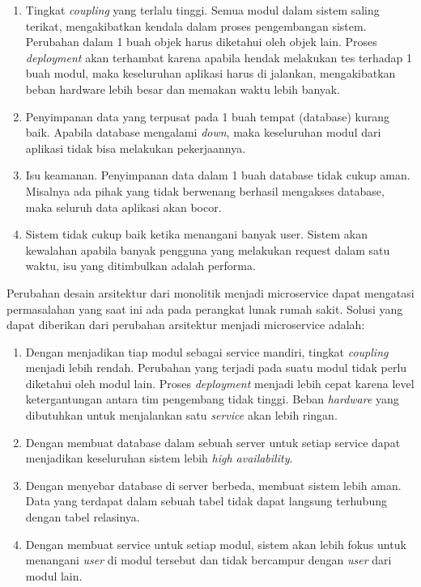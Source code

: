 \begin{enumerate}[leftmargin=*]
	\item Tingkat \textit{coupling} yang terlalu tinggi. Semua modul dalam sistem saling terikat, mengakibatkan kendala dalam proses pengembangan sistem. Perubahan dalam 1 buah objek harus diketahui oleh objek lain. Proses \textit{deployment} akan terhambat karena apabila hendak melakukan tes terhadap 1 buah modul, maka keseluruhan aplikasi harus di jalankan, mengakibatkan beban hardware lebih besar dan memakan waktu lebih banyak.
	\item Penyimpanan data yang terpusat pada 1 buah tempat (database) kurang baik. Apabila database mengalami \textit{down}, maka keseluruhan modul dari aplikasi tidak bisa melakukan pekerjaannya.
	\item Isu keamanan. Penyimpanan data dalam 1 buah database tidak cukup aman. Misalnya ada pihak yang tidak berwenang berhasil mengakses database, maka seluruh data aplikasi akan bocor.
	\item Sistem tidak cukup baik ketika menangani banyak user. Sistem akan kewalahan apabila banyak pengguna yang melakukan request dalam satu waktu, isu yang ditimbulkan adalah performa.
\end{enumerate}

Perubahan desain arsitektur dari monolitik menjadi microservice dapat mengatasi permasalahan yang saat ini ada pada perangkat lunak rumah sakit. Solusi yang dapat diberikan dari perubahan arsitektur menjadi microservice adalah:

\begin{enumerate}[leftmargin=*]
	\item Dengan menjadikan tiap modul sebagai service mandiri, tingkat \textit{coupling} menjadi lebih rendah. Perubahan yang terjadi pada suatu modul tidak perlu diketahui oleh modul lain. Proses \textit{deployment} menjadi lebih cepat karena level ketergantungan antara tim pengembang tidak tinggi. Beban \textit{hardware} yang dibutuhkan untuk menjalankan satu \textit{service} akan lebih ringan.
	\item Dengan membuat database dalam sebuah server untuk setiap service dapat menjadikan keseluruhan sistem lebih \textit{high availability}.
	\item Dengan menyebar database di server berbeda, membuat sistem lebih aman. Data yang terdapat dalam sebuah tabel tidak dapat langsung terhubung dengan tabel relasinya.
	\item Dengan membuat service untuk setiap modul, sistem akan lebih fokus untuk menangani \textit{user} di modul tersebut dan tidak bercampur dengan \textit{user} dari modul lain.
\end{enumerate}

